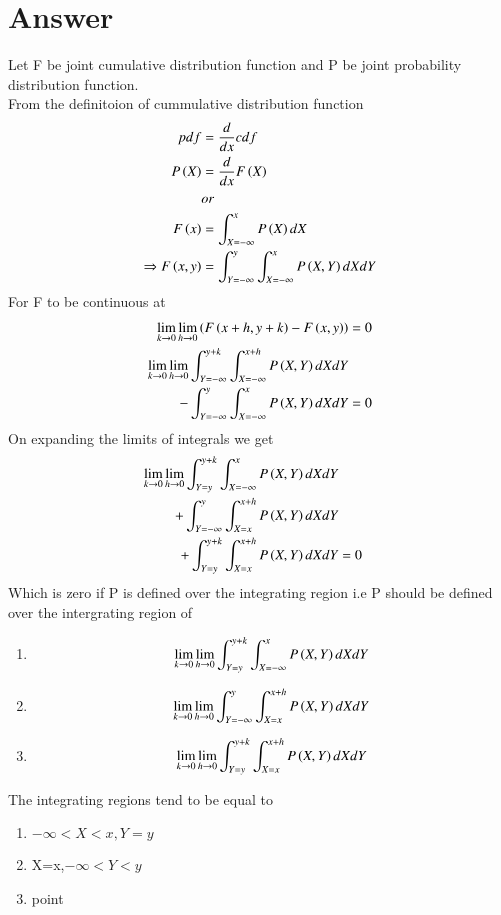 \documentclass[journal,12pt,twocolumn]{IEEEtran}
\begin{document}
\section{Answer}
Let F be joint cumulative distribution function and P be joint probability distribution function.\\
From the definitoion of cummulative distribution function 
\begin{align}
pdf &= \frac{d}{dx} cdf \nonumber \\
P\left(X\right) &= \frac{d}{dx} F\left(X\right)\nonumber\\
&or\nonumber\\
F\left(x\right) &= \int_{X=-\infty}^x P\left(X\right)dX\\
\Rightarrow F\left(x,y\right) &= \int_{Y=-\infty}^y \int_{X=-\infty}^x P\left(X,Y\right)dXdY
\end{align}
For F to be continuous at \\
\begin{align}
\lim_{k\rightarrow 0}\lim_{h\rightarrow 0} \left(F\left(x+h,y+k\right) - F\left(x,y\right)\right)&=0\\
\lim_{k\rightarrow 0}\lim_{h\rightarrow 0}\int_{Y=-\infty}^{y+k} \int_{X=-\infty}^{x+h} P\left(X,Y\right)dXdY \nonumber\\
-\int_{Y=-\infty}^y \int_{X=-\infty}^x P\left(X,Y\right)dXdY&=0 
\end{align}
On expanding the limits of integrals we get
\begin{align}
\lim_{k\rightarrow 0}\lim_{h\rightarrow 0} \int_{Y=y}^{y+k} \int_{X=-\infty}^x P\left(X,Y\right)dXdY \nonumber \\
+\int_{Y=-\infty}^y \int_{X=x}^{x+h} P\left(X,Y\right)dXdY \nonumber \\
+\int_{Y=y}^{y+k} \int_{X=x}^{x+h} P\left(X,Y\right)dXdY&=0
\end{align}
Which is zero if P is defined over the integrating region i.e P should be defined over the intergrating region of 
\begin{enumerate}
\item \[\lim_{k\rightarrow 0}\lim_{h\rightarrow 0} \int_{Y=y}^{y+k} \int_{X=-\infty}^x P\left(X,Y\right)dXdY\]
\item \[\lim_{k\rightarrow 0}\lim_{h\rightarrow 0} \int_{Y=-\infty}^y \int_{X=x}^{x+h} P\left(X,Y\right)dXdY\]
\item \[\lim_{k\rightarrow 0}\lim_{h\rightarrow 0} \int_{Y=y}^{y+k} \int_{X=x}^{x+h} P\left(X,Y\right)dXdY\]
\end{enumerate}
The integrating regions tend to be equal to 
\begin{enumerate}
\item $-\infty<X<x,Y=y$  
\item X=x,$-\infty<Y<y$ 
\item point  
\end{enumerate}
\end{document}
